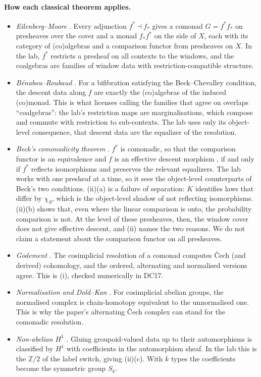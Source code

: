 \documentclass[11pt]{article}
\theoremstyle{definition}\newtheorem{definition}{Definition}\newtheorem{remark}{Remark}
\begin{document}
\paragraph{How each classical theorem applies.}
\begin{itemize}
\item \emph{Eilenberg--Moore} \cite{EilenbergMoore1965}. Every adjunction $f^*\dashv f_*$ gives a comonad $G=f^*f_*$ on presheaves over the
  cover and a monad $f_*f^*$ on the side of $X$, each with its category of (co)algebras and a comparison functor
  from presheaves on $X$. In the lab, $f^*$ restricts a presheaf on all contexts to the windows, and the coalgebras are
  families of window data with restriction-compatible structure.
\item \emph{Bénabou--Roubaud} \cite{BenabouRoubaud1970}. For a bifibration satisfying the Beck--Chevalley condition, the descent data
  along $f$ are exactly the (co)algebras of the induced (co)monad. This is what licenses calling the families that agree on overlaps
  ``coalgebras'': the lab's restriction maps are marginalisations, which compose and commute with restriction to sub-contexts. The lab
  uses only its object-level consequence, that descent data are the equalizer of the resolution.
\item \emph{Beck's comonadicity theorem} \cite{Beck1967,MacLane1998}. $f^*$ is comonadic, so that the comparison functor is an
  equivalence and $f$ is an effective descent morphism \cite{JanelidzeTholen1994}, if and only if $f^*$ reflects isomorphisms and
  preserves the relevant equalizers. The lab works with one presheaf at a time, so it sees the object-level counterparts of Beck's two conditions. (ii)(a) is
  a failure of separation: $K$ identifies laws that differ by $\chi_S$, which is the object-level shadow of not reflecting
  isomorphisms. (ii)(b) shows that, even where the linear comparison is onto, the probability comparison is not. At the level of these
  presheaves, then, the window cover does not give effective descent, and (ii) names the two reasons. We do not claim a statement about
  the comparison functor on all presheaves.
\item \emph{Godement} \cite{Godement1958}. The cosimplicial resolution of a comonad computes Čech (and derived) cohomology, and the
  ordered, alternating and normalised versions agree. This is (i), checked numerically in DC17.
\item \emph{Normalisation and Dold--Kan} \cite{Weibel1994}. For cosimplicial abelian groups, the normalised complex is chain-homotopy
  equivalent to the unnormalised one. This is why the paper's alternating Čech complex can stand for the comonadic resolution.
\item \emph{Non-abelian $H^1$} \cite{Giraud1971}. Gluing groupoid-valued data up to their automorphisms is classified by $H^1$ with
  coefficients in the automorphism sheaf. In the lab this is the $\mathbb Z/2$ of the label switch, giving (ii)(c). With $k$ types the
  coefficients become the symmetric group $S_k$.
\end{itemize}
\end{document}
